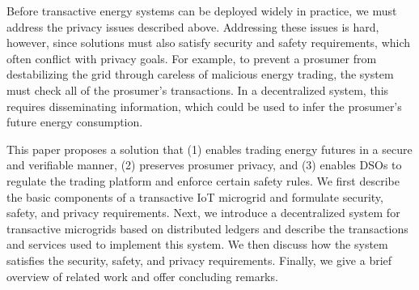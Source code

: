 Before transactive energy systems can be deployed widely in practice,
we must address the privacy issues described above.  Addressing these
issues is hard, however, since solutions must also satisfy security
and safety requirements, which often conflict with privacy goals.  For
example, to prevent a prosumer from destabilizing the grid through
careless of malicious energy trading, the system must check all of the
prosumer's transactions.  In a decentralized system, this requires
disseminating information, which could be used to infer the prosumer's
future energy consumption.

      This
paper proposes a solution that (1) enables trading energy futures in a
secure and verifiable manner, (2) preserves prosumer privacy, and (3)
enables DSOs to regulate the trading platform and enforce certain
safety rules.    We first describe the basic components of a
transactive IoT microgrid and formulate security, safety, and privacy
requirements.  Next, we introduce a decentralized system for
transactive microgrids based on distributed ledgers and describe the
transactions and services used to implement this system.  We then
discuss how the system satisfies the security, safety, and privacy
requirements.  Finally, we give a brief overview of related work and
offer concluding remarks.


